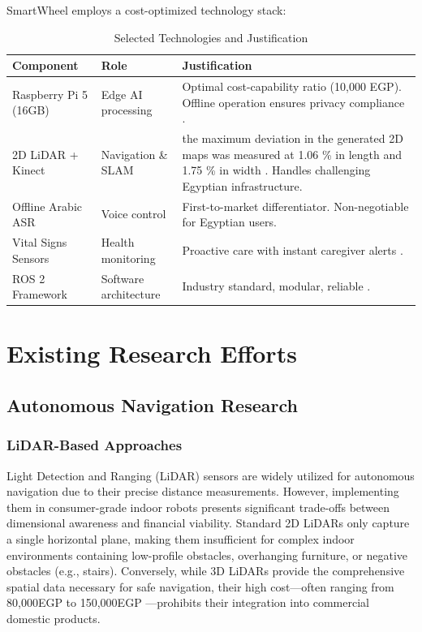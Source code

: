 \documentclass[12pt,a4paper]{report}
\begin{document}
SmartWheel employs a cost-optimized technology stack:

\begin{table}[H]
\centering
\caption{Selected Technologies and Justification}
\label{tab:selected_tech}
\begin{tabularx}{\textwidth}{@{}p{3cm}p{5cm}X@{}}
\toprule
\textbf{Component} & \textbf{Role} & \textbf{Justification} \\
\midrule
Raspberry Pi 5 (16GB) & Edge AI processing & Optimal cost-capability ratio (10,000 EGP). Offline operation ensures privacy compliance \cite{egypt_law_151}. \\
\midrule
2D LiDAR + Kinect & Navigation \& SLAM & the maximum deviation in the generated 2D maps was measured at 1.06 \% in length and 1.75 \% in width \cite{tu2025design}. Handles challenging Egyptian infrastructure. \\
\midrule
Offline Arabic ASR & Voice control & First-to-market differentiator. Non-negotiable for Egyptian users. \\
\midrule
Vital Signs Sensors & Health monitoring & Proactive care with instant caregiver alerts \cite{sonekar_2024}. \\
\midrule
ROS 2 Framework & Software architecture & Industry standard, modular, reliable \cite{ros2}. \\
\bottomrule
\end{tabularx}
\end{table}

\section{Existing Research Efforts}

\subsection{Autonomous Navigation Research}

\subsubsection{LiDAR-Based Approaches}

Light Detection and Ranging (LiDAR) sensors are widely utilized for autonomous navigation due to their precise distance measurements. However, implementing them in consumer-grade indoor robots presents significant trade-offs between dimensional awareness and financial viability. Standard 2D LiDARs only capture a single horizontal plane, making them insufficient for complex indoor environments containing low-profile obstacles, overhanging furniture, or negative obstacles (e.g., stairs). Conversely, while 3D LiDARs provide the comprehensive spatial data necessary for safe navigation, their high cost—often ranging from 80,000EGP to 150,000EGP —prohibits their integration into commercial domestic products.
\end{document}
